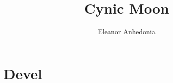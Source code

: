 \documentclass[]{cynicmoon}
\title{Cynic Moon}
\author{Eleanor Anhedonia}
\begin{document}
\maketitle
\tableofcontents

\part{Devel}
\end{document}
